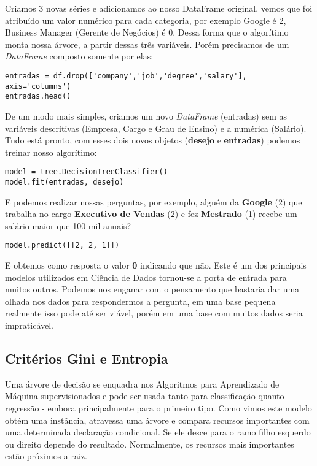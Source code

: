 Criamos 3 novas séries e adicionamos ao nosso DataFrame original, vemos que foi atribuído um valor numérico para cada categoria, por exemplo Google é 2, Business Manager (Gerente de Negócios) é 0. Dessa forma que o algorítimo monta nossa árvore, a partir dessas três variáveis. Porém precisamos de um \textit{DataFrame} composto somente por elas:
\begin{lstlisting}[]
entradas = df.drop(['company','job','degree','salary'], axis='columns')
entradas.head()
\end{lstlisting}

De um modo mais simples, criamos um novo \textit{DataFrame} (entradas) sem as variáveis descritivas (Empresa, Cargo e Grau de Ensino) e a numérica (Salário). Tudo está pronto, com esses dois novos objetos (\textbf{desejo} e \textbf{entradas}) podemos treinar nosso algorítimo:
\begin{lstlisting}[]
model = tree.DecisionTreeClassifier()
model.fit(entradas, desejo)
\end{lstlisting}

E podemos realizar nossas perguntas, por exemplo, alguém da \textbf{Google} (2) que trabalha no cargo \textbf{Executivo de Vendas} (2) e fez \textbf{Mestrado} (1) recebe um salário maior que 100 mil anuais?
\begin{lstlisting}[]
model.predict([[2, 2, 1]])
\end{lstlisting}

E obtemos como resposta o valor \textbf{0} indicando que não. Este é um dos principais modelos utilizados em Ciência de Dados tornou-se a porta de entrada para muitos outros. Podemos nos enganar com o pensamento que bastaria dar uma olhada nos dados para respondermos a pergunta, em uma base pequena realmente isso pode até ser viável, porém em uma base com muitos dados seria impraticável.

\subsection{Critérios Gini e Entropia}
Uma árvore de decisão se enquadra nos Algoritmos para Aprendizado de Máquina supervisionados e pode ser usada tanto para classificação quanto regressão - embora principalmente para o primeiro tipo. Como vimos este modelo obtém uma instância, atravessa uma árvore e compara recursos importantes com uma determinada declaração condicional. Se ele desce para o ramo filho esquerdo ou direito depende do resultado. Normalmente, os recursos mais importantes estão próximos a raiz.

